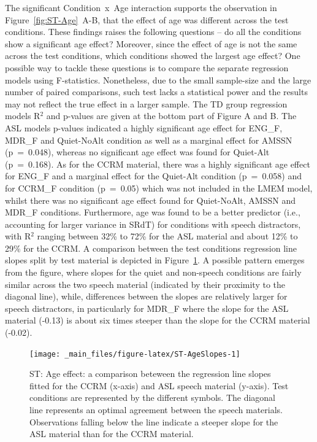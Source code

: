 \documentclass[a4paper, twoside]{templates/ociamthesis}
\begin{document}
The significant Condition~x~Age interaction supports the observation in Figure~\ref{fig:ST-Age}~A-B, that the effect of age was different across the test conditions. These findings raises the following questions -- do all the conditions show a significant age effect? Moreover, since the effect of age is not the same across the test conditions, which conditions showed the largest age effect? One possible way to tackle these questions is to compare the separate regression models using F-statistics. Nonetheless, due to the small sample-size and the large number of paired comparisons, such test lacks a statistical power and the results may not reflect the true effect in a larger sample. The TD group regression models R\(^{2}\) and p-values are given at the bottom part of Figure A and B. The ASL models p-values indicated a highly significant age effect for ENG\_F, MDR\_F and Quiet-NoAlt condition as well as a marginal effect for AMSSN (p~=~0.048), whereas no significant age effect was found for Quiet-Alt (p~=~0.168). As for the CCRM material, there was a highly significant age effect for ENG\_F and a marginal effect for the Quiet-Alt condition (p~=~0.058) and for CCRM\_F condition (p~=~0.05) which was not included in the LMEM model, whilst there was no significant age effect found for Quiet-NoAlt, AMSSN and MDR\_F conditions. Furthermore, age was found to be a better predictor (i.e., accounting for larger variance in SRdT) for conditions with speech distractors, with R\(^{2}\) ranging between 32\% to 72\% for the ASL material and about 12\% to 29\% for the CCRM. A comparison between the test conditions regression line slopes split by test material is depicted in Figure~\ref{fig:ST-AgeSlopes}. A possible pattern emerges from the figure, where slopes for the quiet and non-speech conditions are fairly similar across the two speech material (indicated by their proximity to the diagonal line), while, differences between the slopes are relatively larger for speech distractors, in particularly for MDR\_F where the slope for the ASL material (-0.13) is about six times steeper than the slope for the CCRM material (-0.02).\\

\begin{figure}

{\centering \texttt{[image: \_main\_files/figure-latex/ST-AgeSlopes-1]} 

}

\caption{ST: Age effect: a comparison beteween the regression line slopes fitted for the CCRM (x-axis) and ASL speech material (y-axis). Test conditions are represented by the different symbols. The diagonal line represents an optimal agreement between the speech materials. Observations falling below the line indicate a steeper slope for the ASL material than for the CCRM material.}\label{fig:ST-AgeSlopes}
\end{figure}
\end{document}
